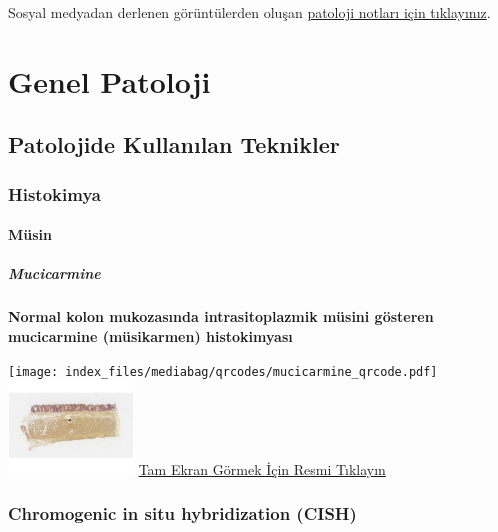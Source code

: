 \documentclass[
  letterpaper,
  DIV=11,
  numbers=noendperiod]{scrreprt}
\begin{document}
Sosyal medyadan derlenen görüntülerden oluşan
\href{https://www.patolojinotlari.com/}{patoloji notları için
tıklayınız}.

\part{Genel Patoloji}

\hypertarget{sec-patolojide-kullanilan-teknikler}{%
\chapter{Patolojide Kullanılan
Teknikler}\label{sec-patolojide-kullanilan-teknikler}}

\hypertarget{sec-histokimya}{%
\section{Histokimya}\label{sec-histokimya}}

\hypertarget{sec-musin}{%
\subsection{Müsin}\label{sec-musin}}

\hypertarget{sec-mucicarmine}{%
\subsubsection{Mucicarmine}\label{sec-mucicarmine}}

\textbf{Normal kolon mukozasında intrasitoplazmik müsini gösteren
mucicarmine (müsikarmen) histokimyası}

\texttt{[image: index\_files/mediabag/qrcodes/mucicarmine\_qrcode.pdf]}
\href{https://images.patolojiatlasi.com/mucin/mucicarmine.html}{\includegraphics[width=0.25\textwidth,height=\textheight]{./screenshots/thumbnail_mucicarmine.png}}
\href{https://images.patolojiatlasi.com/mucin/mucicarmine.html}{Tam
Ekran Görmek İçin Resmi Tıklayın}

\hypertarget{sec-chromogenic-in-situ-hybridization-cish}{%
\section{Chromogenic in situ hybridization
(CISH)}\label{sec-chromogenic-in-situ-hybridization-cish}}
\end{document}
